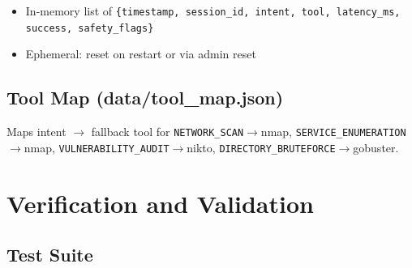 \documentclass[10pt,journal,onecolumn]{IEEEtran}
\begin{document}
\begin{itemize}
\item In-memory list of \texttt{\{timestamp, session\_\allowbreak id, intent, tool, latency\_\allowbreak ms, success, safety\_\allowbreak flags\}}
\item Ephemeral: reset on restart or via admin reset
\end{itemize}

\subsection{Tool Map (data/tool\_map.json)}

Maps intent $\rightarrow$ fallback tool for \texttt{NETWORK\_SCAN}$\rightarrow$nmap, \texttt{SERVICE\_ENUMERATION}$\rightarrow$nmap, \texttt{VULNERABILITY\_AUDIT}$\rightarrow$nikto, \texttt{DIRECTORY\_BRUTEFORCE}$\rightarrow$gobuster.

\section{Verification and Validation}

\subsection{Test Suite}
\end{document}
